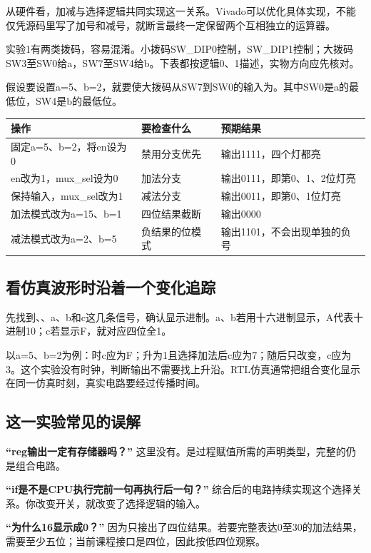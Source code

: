 从硬件看，加减与选择逻辑共同实现这一关系。Vivado可以优化具体实现，不能仅凭源码里写了加号和减号，就断言最终一定保留两个互相独立的运算器。

实验1有两类拨码，容易混淆。小拨码SW\_DIP0控制，SW\_DIP1控制；大拨码SW3至SW0给a，SW7至SW4给b。下表都按逻辑0、1描述，实物方向应先核对。

假设要设置a=5、b=2，就要使大拨码从SW7到SW0的输入为。其中SW0是a的最低位，SW4是b的最低位。
\begin{center}
\begin{tabularx}{\linewidth}{@{}lXX@{}}\toprule
操作 & 要检查什么 & 预期结果\\\midrule
固定a=5、b=2，将en设为0 & 禁用分支优先 & 输出1111，四个灯都亮\\
en改为1，mux\_sel设为0 & 加法分支 & 输出0111，即第0、1、2位灯亮\\
保持输入，mux\_sel改为1 & 减法分支 & 输出0011，即第0、1位灯亮\\
加法模式改为a=15、b=1 & 四位结果截断 & 输出0000\\
减法模式改为a=2、b=5 & 负结果的位模式 & 输出1101，不会出现单独的负号\\\bottomrule
\end{tabularx}
\end{center}

\subsection{看仿真波形时沿着一个变化追踪}
先找到、、a、b和c这几条信号，确认显示进制。a、b若用十六进制显示，A代表十进制10；c若显示F，就对应四位全1。

以a=5、b=2为例：时c应为F；升为1且选择加法后c应为7；随后只改变，c应为3。这个实验没有时钟，判断输出不需要找上升沿。RTL仿真通常把组合变化显示在同一仿真时刻，真实电路要经过传播时间。

\subsection{这一实验常见的误解}
\textbf{“reg输出一定有存储器吗？”} 这里没有。是过程赋值所需的声明类型，完整的仍是组合电路。

\textbf{“if是不是CPU执行完前一句再执行后一句？”} 综合后的电路持续实现这个选择关系。你改变开关，就改变了选择逻辑的输入。

\textbf{“为什么16显示成0？”} 因为只接出了四位结果。若要完整表达0至30的加法结果，需要至少五位；当前课程接口是四位，因此按低四位观察。

